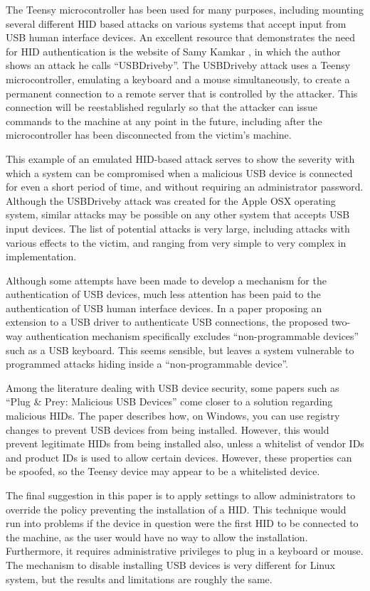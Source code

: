\documentclass[pagenumbers]{ieee}
\begin{document}
The Teensy microcontroller has been used for many purposes, including mounting several different HID based attacks on various systems that accept input from USB human interface devices. An excellent resource that demonstrates the need for HID authentication is the website of Samy Kamkar \cite{samy}, in which the author shows an attack he calls ``USBDriveby''. The USBDriveby attack uses a Teensy microcontroller, emulating a keyboard and a mouse simultaneously,  to create a permanent connection to a remote server that is controlled by the attacker. This connection will be reestablished regularly so that the attacker can issue commands to the machine at any point in the future, including after the microcontroller has been disconnected from the victim's machine.

This example of an emulated HID-based attack serves to show the severity with which a system can be compromised when a malicious USB device is connected for even a short period of time, and without requiring an administrator password. Although the USBDriveby attack was created for the Apple OSX operating system, similar attacks may be possible on any other system that accepts USB input devices. The list of potential attacks is very large, including attacks with various effects to the victim, and ranging from very simple to very complex in implementation.

Although some attempts have been made to develop a mechanism for the authentication of USB devices, much less attention has been paid to the authentication of USB human interface devices. In a paper \cite{wang} proposing an extension to a USB driver to authenticate USB connections, the proposed two-way authentication mechanism specifically excludes ``non-programmable devices'' such as a USB keyboard. This seems sensible, but leaves a system vulnerable to programmed attacks hiding inside a ``non-programmable device''.

Among the literature dealing with USB device security, some papers such as ``Plug \& Prey: Malicious USB Devices'' \cite{crenshaw} come closer to a solution regarding malicious HIDs. The paper describes how, on Windows, you can use registry changes to prevent USB devices from being installed. However, this would prevent legitimate HIDs from being installed also, unless a whitelist of vendor IDs and product IDs is used to allow certain devices. However, these properties can be spoofed, so the Teensy device may appear to be a whitelisted device.

The final suggestion in this paper is to apply settings to allow administrators to override the policy preventing the installation of a HID. This technique would run into problems if the device in question were the first HID to be connected to the machine, as the user would have no way to allow the installation. Furthermore, it requires administrative privileges to plug in a keyboard or mouse. The mechanism to disable installing USB devices is very different for Linux system, but the results and limitations are roughly the same.
\end{document}
